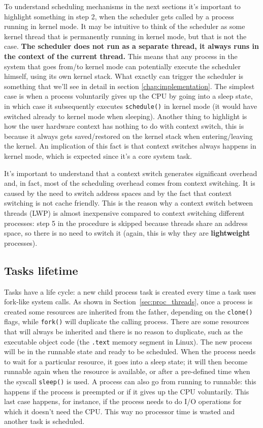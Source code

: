 To understand scheduling mechanisms in the next sections it's important to highlight something in step 2, when the scheduler gets called by a process running in kernel mode. It may be intuitive to think of the scheduler as some kernel thread that is permanently running in kernel mode, but that is not the case. \textbf{The scheduler does not run as a separate thread, it always runs in the context of the current thread.} This means that any process in the system that goes from/to kernel mode can potentially execute the scheduler himself, using its own kernel stack. What exactly can trigger the scheduler is something that we'll see in detail in section \ref{chap:implementation}. The simplest case is when a process voluntarily gives up the CPU by going into a sleep state, in which case it subsequently executes \verb|schedule()| in kernel mode (it would have switched already to kernel mode when sleeping). %
Another thing to highlight is how the user hardware context has nothing to do with context switch, this is because it always gets saved/restored on the kernel stack when entering/leaving the kernel. An implication of this fact is that context switches always happens in kernel mode, which is expected since it's a core system task.

It's important to understand that a context switch generates significant overhead and, in fact, most of the scheduling overhead comes from context switching. It is caused by the need to switch address spaces and by the fact that context switching is not cache friendly. This is the reason why a context switch between threads (LWP) is almost inexpensive compared to context switching different processes: step 5 in the procedure is skipped because threads share an address space, so there is no need to switch it (again, this is why they are \textbf{lightweight} processes).

\subsection{Tasks lifetime}
\label{sec:task_lifetime}
Tasks have a life cycle: a new child process task is created every time a task uses fork-like system calls. As shown in Section~\ref{sec:proc_threads}, once a process is created some resources are inherited from the father, depending on the \verb|clone()| flags, while \verb|fork()| will duplicate the calling process. There are some resources that will always be inherited and there is no reason to duplicate, such as the executable object code (the \verb|.text| memory segment in Linux). The new process will be in the runnable state and ready to be scheduled. When the process needs to wait for a particular resource, it goes into a sleep state; it will then become runnable again when the resource is available, or after a pre-defined time when the syscall \verb|sleep()| is used. A process can also go from running to runnable: this happens if the process is preempted or if it gives up the CPU voluntarily. This last case happens, for instance, if the process needs to do I/O operations for which it doesn't need the CPU. This way no processor time is wasted and another task is scheduled.

